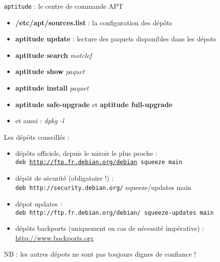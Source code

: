 \documentclass[french]{beamer}
\begin{document}
\begin{frame}
	\begin{center}
	\texttt{aptitude} : le centre de commande APT
	\end{center}
	\begin{itemize}
	\item \textbf{/etc/apt/sources.list} : la configuration des dépôts
	\item \textbf{aptitude update} : lecture des paquets disponibles dans les dépots 
	\item \textbf{aptitude search} \textit{motclef}
	\item \textbf{aptitude show} \textit{paquet}
	\item \textbf{aptitude install} \textit{paquet}
	\item \textbf{aptitude safe-upgrade} et  \textbf{aptitude full-upgrade}
	\item et aussi : \textit{dpkg -l}
	\end{itemize}
\end{frame}

\begin{frame}
\begin{block}{ Les dépôts conseillés :}
	\begin{itemize}
	\item dépôts officiels, depuis le miroir le plus proche : \\
	 \texttt{deb \url{http://ftp.fr.debian.org/debian} squeeze main}
	\item dépôt de sécurité (obligatoire !) : \\
	 \texttt{deb http://security.debian.org/} squeeze/updates main
	\item dépot updates : \\
	\texttt{deb http://ftp.fr.debian.org/debian/ squeeze-updates main}
	\item dépôts backports (uniquement en cas de nécessité impérative) : \url{http://www.backports.org}
	\end{itemize}
\end{block}
NB : les autres dépots ne sont pas toujours dignes de confiance !
\end{frame}



\end{document}
